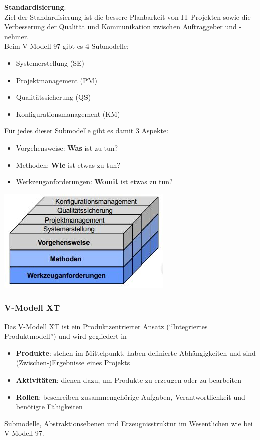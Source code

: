 \documentclass[a4paper,12pt]{article}
\begin{document}
	\textbf{Standardisierung}:\\
	Ziel der Standardisierung ist die bessere Planbarkeit von IT-Projekten sowie die Verbesserung der Qualität und Kommunikation zwischen Auftraggeber und -nehmer.\\
	
	Beim V-Modell 97 gibt es 4 Submodelle:
	\begin{itemize}
		\item Systemerstellung (SE)
		\item Projektmanagement (PM)
		\item Qualitätssicherung (QS)
		\item Konfigurationsmanagement (KM)
	\end{itemize}
	Für jedes dieser Submodelle gibt es damit 3 Aspekte:
	\begin{itemize}
		\item Vorgehensweise: \textbf{Was} ist zu tun?
		\item Methoden: \textbf{Wie} ist etwas zu tun?
		\item Werkzeuganforderungen: \textbf{Womit} ist etwas zu tun?
	\end{itemize}
	\begin{center}
		\includegraphics[scale=1.5]{pics/vmodell97.jpg}
	\end{center}
	\subsubsection*{V-Modell XT}
	Das V-Modell XT ist ein Produktzentrierter Ansatz ("`Integriertes Produktmodell"') und wird gegliedert in
	\begin{itemize}
		\item \textbf{Produkte}: stehen im Mittelpunkt, haben definierte Abhängigkeiten und sind (Zwischen-)Ergebnisse eines Projekts
		\item \textbf{Aktivitäten}: dienen dazu, um Produkte zu erzeugen oder zu bearbeiten
		\item \textbf{Rollen}: beschreiben zusammengehörige Aufgaben, Verantwortlichkeit und benötigte Fähigkeiten
	\end{itemize}
	Submodelle, Abstraktionsebenen und Erzeugnisstruktur im Wesentlichen wie bei V-Modell 97.\\
	
\end{document}
